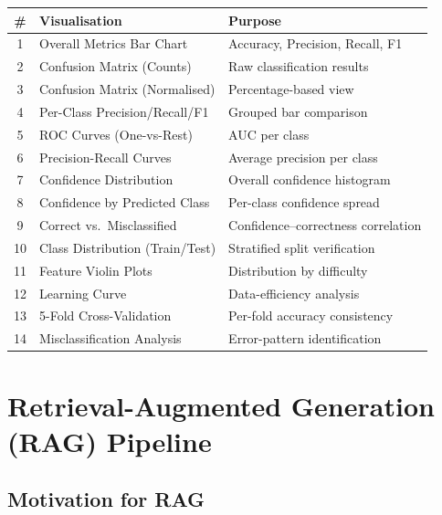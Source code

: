 \documentclass[12pt, a4paper, twoside]{article}
\begin{document}
\begin{center}
\renewcommand{\arraystretch}{1.25}
\small
\begin{tabularx}{\textwidth}{c l X}
    \toprule
    \textbf{\#} & \textbf{Visualisation} & \textbf{Purpose} \\
    \midrule
    1  & Overall Metrics Bar Chart & Accuracy, Precision, Recall, F1 \\
    2  & Confusion Matrix (Counts) & Raw classification results \\
    3  & Confusion Matrix (Normalised) & Percentage-based view \\
    4  & Per-Class Precision/Recall/F1 & Grouped bar comparison \\
    5  & ROC Curves (One-vs-Rest) & AUC per class \\
    6  & Precision-Recall Curves & Average precision per class \\
    7  & Confidence Distribution & Overall confidence histogram \\
    8  & Confidence by Predicted Class & Per-class confidence spread \\
    9  & Correct vs.\ Misclassified & Confidence--correctness
                                        correlation \\
    10 & Class Distribution (Train/Test) & Stratified split
                                            verification \\
    11 & Feature Violin Plots & Distribution by difficulty \\
    12 & Learning Curve & Data-efficiency analysis \\
    13 & 5-Fold Cross-Validation & Per-fold accuracy consistency \\
    14 & Misclassification Analysis & Error-pattern identification \\
    \bottomrule
\end{tabularx}
\end{center}

\section{Retrieval-Augmented Generation (RAG) Pipeline}\label{sec:rag}

\subsection{Motivation for RAG}
\end{document}
